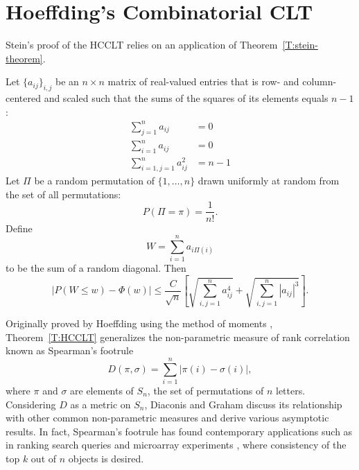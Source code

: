 \section{Hoeffding's Combinatorial CLT}
Stein's proof of the HCCLT relies on an application of Theorem~\ref{T:stein-theorem}.
\begin{theorem}\label{T:HCCLT}
  Let $\{a_{ij}\}_{i,j}$ be an $n \times n$ matrix of real-valued
  entries that is row- and column-centered and scaled such that the sums
  of the squares of its elements equals $n-1$:
  \begin{align*}
    \sum_{j=1}^n a_{ij} &= 0 \\
    \sum_{i=1}^n a_{ij} &= 0 \\
    \sum_{i=1, j=1}^n a_{ij}^2 &= n-1
  \end{align*}
  Let $\Pi$ be a random permutation of $\{1, \ldots, n\}$ drawn
  uniformly at random from the set of all permutations:
  \begin{equation*}
    P(\Pi = \pi) = \frac{1}{n!}.
  \end{equation*}
  Define
  \begin{equation*}
    W = \sum_{i=1}^n a_{i\Pi(i)}
  \end{equation*}
  to be the sum of a random diagonal.  Then
  \begin{equation*}
    |P(W \leq w) - \Phi(w)| \leq
    \frac{C}{\sqrt{n}} \left [
      \sqrt{\sum_{i, j = 1}^{n} a_{ij}^4} +
      \sqrt{\sum_{i, j = 1}^{n} |a_{ij}|^3}
    \right ].
  \end{equation*}
\end{theorem}

Originally proved by Hoeffding using the method of moments
\cite{hoeffding1951combinatorial}, Theorem~\ref{T:HCCLT} generalizes
the non-parametric measure of rank correlation known as Spearman's
footrule \cite{spearman1904proof} \cite{salama1990note}
\begin{equation*}
  D(\pi, \sigma) = \sum_{i=1}^n |\pi(i) - \sigma(i)|,
\end{equation*}
where $\pi$ and $\sigma$ are elements of $S_n$, the set of
permutations of $n$ letters.  Considering $D$ as a metric on $S_n$,
Diaconis and Graham \cite{diaconis1977spearman} discuss its
relationship with other common non-parametric measures and derive
various asymptotic results.  In fact, Spearman's footrule has found
contemporary applications such as in ranking search queries and microarray
experiments \cite{sens2011spearman}, where consistency of the top
$k$ out of $n$ objects is desired.


